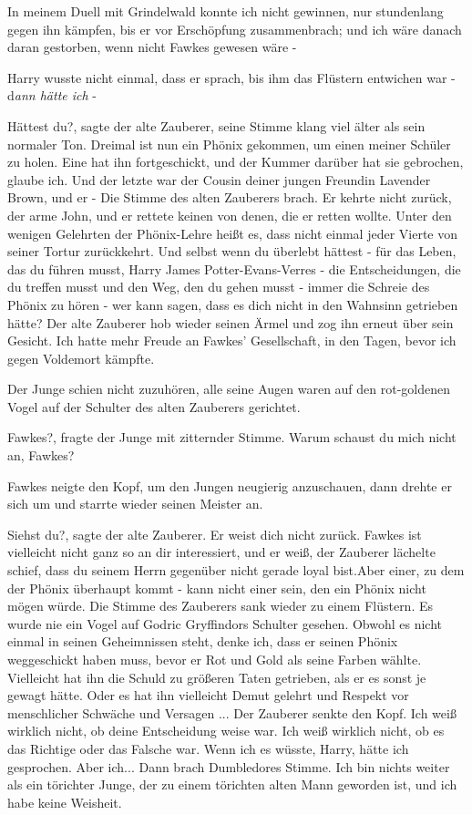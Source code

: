 \glqq{}In meinem Duell mit Grindelwald konnte ich nicht gewinnen, nur stundenlang
gegen ihn kämpfen, bis er vor Erschöpfung zusammenbrach; und ich wäre danach
daran gestorben, wenn nicht Fawkes gewesen wäre -

Harry wusste nicht einmal, dass er sprach, bis ihm das Flüstern entwichen war -
\glqq{}d\emph{ann hätte ich} -\grqq{}

\glqq{}Hättest du?\grqq{}, sagte der alte Zauberer, seine Stimme klang viel älter
als sein normaler Ton. \glqq{}Dreimal ist nun ein Phönix gekommen, um einen
meiner Schüler zu holen. Eine hat ihn fortgeschickt, und der Kummer darüber hat
sie gebrochen, glaube ich. Und der letzte war der Cousin deiner jungen Freundin
Lavender Brown, und er -\grqq{} Die Stimme des alten Zauberers brach. \glqq{}Er
kehrte nicht zurück, der arme John, und er rettete keinen von denen, die er
retten wollte. Unter den wenigen Gelehrten der Phönix-Lehre heißt es, dass nicht
einmal jeder Vierte von seiner Tortur zurückkehrt. Und selbst wenn du überlebt
hättest - für das Leben, das du führen musst, Harry James Potter-Evans-Verres -
die Entscheidungen, die du treffen musst und den Weg, den du gehen musst - immer
die Schreie des Phönix zu hören - wer kann sagen, dass es dich nicht in den
Wahnsinn getrieben hätte?\grqq{} Der alte Zauberer hob wieder seinen Ärmel und
zog ihn erneut über sein Gesicht. \glqq{}Ich hatte mehr Freude an Fawkes'
Gesellschaft, in den Tagen, bevor ich gegen Voldemort kämpfte.\grqq{}

Der Junge schien nicht zuzuhören, alle seine Augen waren auf den rot-goldenen
Vogel auf der Schulter des alten Zauberers gerichtet.

\glqq{}Fawkes?\grqq{}, fragte der Junge mit zitternder Stimme. \glqq{}Warum
schaust du mich nicht an, Fawkes?\grqq{}

Fawkes neigte den Kopf, um den Jungen neugierig anzuschauen, dann drehte er sich
um und starrte wieder seinen Meister an.

\glqq{}Siehst du?\grqq{}, sagte der alte Zauberer. \glqq{}Er weist dich nicht
zurück. Fawkes ist vielleicht nicht ganz so an dir interessiert, und er
weiß\grqq{}, der Zauberer lächelte schief, \glqq{}dass du seinem Herrn gegenüber
nicht gerade loyal bist.Aber einer, zu dem der Phönix überhaupt kommt - kann
nicht einer sein, den ein Phönix nicht mögen würde.\grqq{} Die Stimme des
Zauberers sank wieder zu einem Flüstern. \glqq{}Es wurde nie ein Vogel auf Godric
Gryffindors Schulter gesehen. Obwohl es nicht einmal in seinen Geheimnissen
steht, denke ich, dass er seinen Phönix weggeschickt haben muss, bevor er Rot
und Gold als seine Farben wählte. Vielleicht hat ihn die Schuld zu größeren
Taten getrieben, als er es sonst je gewagt hätte. Oder es hat ihn vielleicht
Demut gelehrt und Respekt vor menschlicher Schwäche und Versagen ...\grqq{} Der
Zauberer senkte den Kopf. \glqq{}Ich weiß wirklich nicht, ob deine Entscheidung
weise war. Ich weiß wirklich nicht, ob es das Richtige oder das Falsche war.
Wenn ich es wüsste, Harry, hätte ich gesprochen. Aber ich...\grqq{} Dann brach
Dumbledores Stimme. \glqq{}Ich bin nichts weiter als ein törichter Junge, der zu
einem törichten alten Mann geworden ist, und ich habe keine Weisheit.\grqq{}

